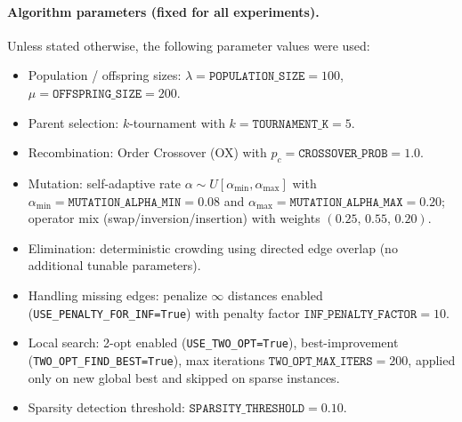 \documentclass[a4paper,10pt]{article}
\begin{document}
\paragraph{Algorithm parameters (fixed for all experiments).}
Unless stated otherwise, the following parameter values were used:
\begin{itemize}
	\item Population / offspring sizes: $\lambda=\texttt{POPULATION\_SIZE}=100$, $\mu=\texttt{OFFSPRING\_SIZE}=200$.
	\item Parent selection: $k$-tournament with $k=\texttt{TOURNAMENT\_K}=5$.
	\item Recombination: Order Crossover (OX) with $p_c=\texttt{CROSSOVER\_PROB}=1.0$.
	\item Mutation: self-adaptive rate $\alpha \sim U[\alpha_{\min},\alpha_{\max}]$ with
	$\alpha_{\min}=\texttt{MUTATION\_ALPHA\_MIN}=0.08$ and $\alpha_{\max}=\texttt{MUTATION\_ALPHA\_MAX}=0.20$;
	operator mix (swap/inversion/insertion) with weights $(0.25,\,0.55,\,0.20)$.
	\item Elimination: deterministic crowding using directed edge overlap (no additional tunable parameters).
	\item Handling missing edges: penalize $\infty$ distances enabled (\texttt{USE\_PENALTY\_FOR\_INF=True}) with
	penalty factor $\texttt{INF\_PENALTY\_FACTOR}=10$.
	\item Local search: 2-opt enabled (\texttt{USE\_TWO\_OPT=True}), best-improvement
	(\texttt{TWO\_OPT\_FIND\_BEST=True}), max iterations $\texttt{TWO\_OPT\_MAX\_ITERS}=200$, applied only on new
	global best and skipped on sparse instances.
	\item Sparsity detection threshold: $\texttt{SPARSITY\_THRESHOLD}=0.10$.
\end{itemize}
\end{document}
